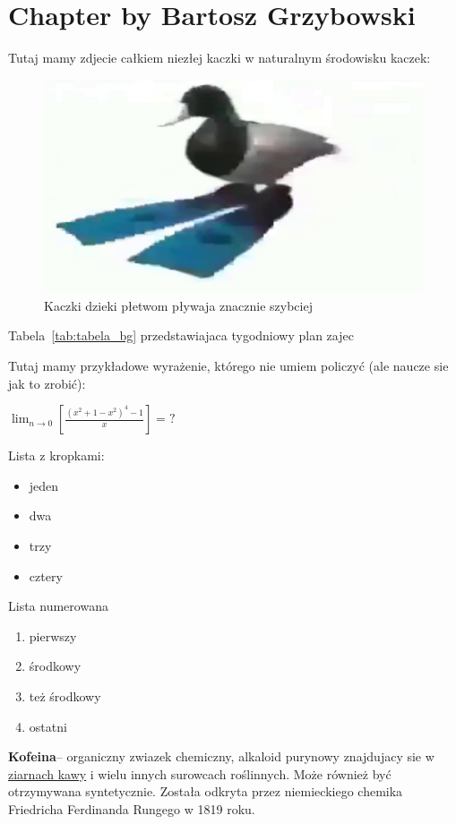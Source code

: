 \pagebreak
\section{Chapter by Bartosz Grzybowski}
\label{sec:bartek}
Tutaj mamy zdjecie całkiem niezłej kaczki w naturalnym środowisku kaczek:

\begin{figure}[htbp]
\centering
\includegraphics[width=1.0\textwidth]{Pictures/duck.jpg}
\caption{Kaczki dzieki płetwom pływaja znacznie szybciej}
\label{fig:duck}
\end{figure}
\bigskip
Tabela~\ref{tab:tabela_bg} przedstawiajaca tygodniowy plan zajec

\newpage

Tutaj mamy przykładowe wyrażenie, którego nie umiem policzyć (ale naucze sie jak to zrobić): 

\begin{math}
\lim_{n \to 0} [\frac{(x^2+1-x^2)^4-1}{x}] = ?
\end{math}

Lista z kropkami:

\begin{itemize}
  \item jeden
  \item dwa
  \item trzy
  \item cztery
\end{itemize}

Lista numerowana

\begin{enumerate}
  \item pierwszy
  \item środkowy
  \item też środkowy
  \item ostatni
\end{enumerate}

\bigskip


\textbf{Kofeina}– organiczny zwiazek chemiczny, alkaloid purynowy znajdujacy sie w \underline{ziarnach kawy} i wielu innych surowcach roślinnych. Może również być otrzymywana syntetycznie. Została odkryta przez niemieckiego chemika Friedricha Ferdinanda Rungego w 1819 roku.